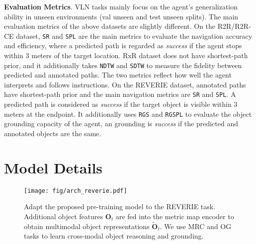\vspace{1mm}
\noindent\textbf{Evaluation Metrics}. VLN tasks mainly focus on the agent's generalization ability in unseen environments (val unseen and test unseen splits).
The main evaluation metrics of the above datasets are slightly different.
On the R2R/R2R-CE dataset, \texttt{SR} and \texttt{SPL} are the main metrics to evaluate the navigation accuracy and efficiency, where a predicted path is regarded as \textit{success} if the agent stops within 3 meters of the target location. 
RxR dataset does not have shortest-path prior, and it additionally takes \texttt{NDTW} and \texttt{SDTW} to measure the fidelity between predicted and annotated paths. The two metrics reflect how well the agent interprets and follows instructions. 
On the REVERIE dataset, annotated paths have shortest-path prior and the main navigation metrics are \texttt{SR} and \texttt{SPL}. A predicted path is considered as \textit{success} if the target object is visible within 3 meters at the endpoint. 
It additionally uses \texttt{RGS} and \texttt{RGSPL} to evaluate the object grounding capacity of the agent, an grounding is \textit{success} if the predicted and annotated objects are the same.



\section{Model Details}\label{sec:sup_model}
\begin{figure*}[h]
\centering
\texttt{[image: fig/arch\_reverie.pdf]}
\vspace{-3mm}
\caption{
Adapt the proposed pre-training model to the REVERIE task. 
Additional object features $\mathbf{O}_t$ are fed into the metric map encoder to obtain multimodal object representations $\widetilde{\mathbf{O}}_{t}$. 
We use MRC and OG tasks to learn cross-modal object reasoning and grounding.
}\label{fig:arch_reverie}
\vspace{-3mm}
\end{figure*}


